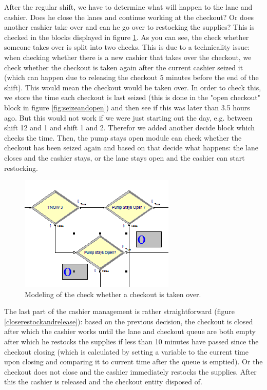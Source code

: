 After the regular shift, we have to determine what will happen to the lane and cashier. Does he close the lanes and continue working at the checkout? Or does another cashier take over and can he go over to restocking the supplies? This is checked in the blocks displayed in figure \ref{fig:determinetakeover}. As you can see, the check whether someone takes over is split into two checks. This is due to a technicality issue: when checking whether there is a new cashier that takes over the checkout, we check whether the checkout is taken again after the current cashier seized it (which can happen due to releasing the checkout 5 minutes before the end of the shift). This would mean the checkout would be taken over. In order to check this, we store the time each checkout is last seized (this is done in the "open checkout" block in figure \ref{fig:seizeandopen}) and then see if this was later than 3.5 hours ago. But this would not work if we were just starting out the day, e.g. between shift 12 and 1 and shift 1 and 2. Therefor we added another decide block which checks the time.
Then, the pump stays open module can check whether the checkout has been seized again and based on that decide what happens: the lane closes and the cashier stays, or the lane stays open and the cashier can start restocking.

\begin{figure}[]
	\includegraphics[scale=1]{images/model-description/determine-takeover.PNG}
	\caption{Modeling of the check whether a checkout is taken over.}
	\label{fig:determinetakeover}
\end{figure}

The last part of the cashier management is rather straightforward (figure \ref{closerestockandrelease}): based on the previous decision, the checkout is closed after which the cashier works until the lane and checkout queue are both empty after which he restocks the supplies if less than 10 minutes have passed since the checkout closing (which is calculated by setting a variable to the current time upon closing and comparing it to current time after the queue is emptied). Or the checkout does not close and the cashier immediately restocks the supplies.
After this the cashier is released and the checkout entity disposed of.

